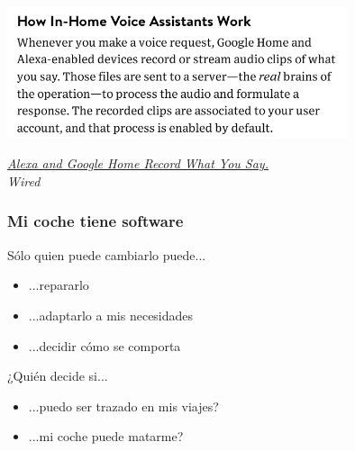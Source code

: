 \documentclass[17pt,aspectratio=169,hyperref=pdfusetitle]{beamer}
\begin{document}
\begin{frame}[fragile]

  \begin{center}
  \includegraphics[width=10cm]{figs/home-assistants}
  \end{center}

  \begin{flushright}
    {\em
      \href{https://www.wired.com/2016/12/alexa-and-google-record-your-voice/}{Alexa and Google Home Record What You Say.} \\
      Wired \\
      }
  \end{flushright}
  
\end{frame}


\begin{frame}
\frametitle{Mi coche tiene software}

Sólo quien puede cambiarlo puede...

\begin{itemize}
\item ...repararlo
\item ...adaptarlo a mis necesidades
\item ...decidir cómo se comporta
\end{itemize}

¿Quién decide si...

\begin{itemize}
\item ...puedo ser trazado en mis viajes?
\item ...mi coche puede matarme?
\end{itemize}

\end{frame}
\end{document}
